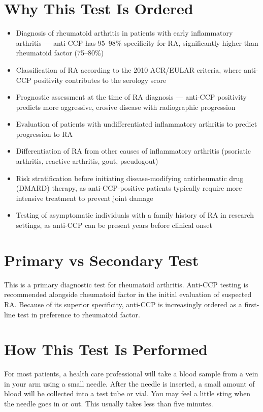 \section*{Why This Test Is Ordered}
\begin{itemize}
  \item Diagnosis of rheumatoid arthritis in patients with early inflammatory arthritis --- anti-CCP has 95--98\% specificity for RA, significantly higher than rheumatoid factor (75--80\%)
  \item Classification of RA according to the 2010 ACR/EULAR criteria, where anti-CCP positivity contributes to the serology score
  \item Prognostic assessment at the time of RA diagnosis --- anti-CCP positivity predicts more aggressive, erosive disease with radiographic progression
  \item Evaluation of patients with undifferentiated inflammatory arthritis to predict progression to RA
  \item Differentiation of RA from other causes of inflammatory arthritis (psoriatic arthritis, reactive arthritis, gout, pseudogout)
  \item Risk stratification before initiating disease-modifying antirheumatic drug (DMARD) therapy, as anti-CCP-positive patients typically require more intensive treatment to prevent joint damage
  \item Testing of asymptomatic individuals with a family history of RA in research settings, as anti-CCP can be present years before clinical onset
\end{itemize}

\section*{Primary vs Secondary Test}
This is a primary diagnostic test for rheumatoid arthritis. Anti-CCP testing is recommended alongside rheumatoid factor in the initial evaluation of suspected RA. Because of its superior specificity, anti-CCP is increasingly ordered as a first-line test in preference to rheumatoid factor.

\section*{How This Test Is Performed}
For most patients, a health care professional will take a blood sample from a vein in your arm using a small needle. After the needle is inserted, a small amount of blood will be collected into a test tube or vial. You may feel a little sting when the needle goes in or out. This usually takes less than five minutes.

